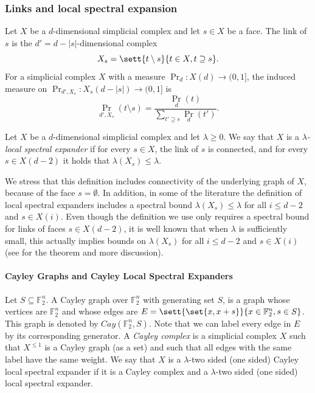 \subsubsection{Links and local spectral expansion} \label{sec:prelims-lse}
Let \(X\) be a \(d\)-dimensional simplicial complex and let \(s \in X\) be a face. The link of \(s\) is the \(d'=d-|s|\)-dimensional complex
\[X_s = \sett{t \setminus s}{t \in X, t \supseteq s}.\] For a simplicial complex \(X\) with a measure \(\Pr_d:X(d) \to (0,1]\), the induced measure on \(\Pr_{d',X_s}:X_s(d-|s|)\to (0,1]\) is \[\Pr_{d',X_s}(t \setminus s) = \frac{\Pr_d(t)}{\sum_{t' \supseteq s} \Pr_d(t')}.\] 

\begin{definition}
    Let \(X\) be a \(d\)-dimensional simplicial complex and let \(\lambda \geq 0\). We say that \(X\) 
    is a \emph{\(\lambda\)-local spectral expander} if for every \(s \in X\), the link of \(s\) is connected, and for every \(s \in X(d-2)\) it holds that \(\lambda(X_s) \leq \lambda\).
\end{definition}
We stress that this definition includes connectivity of the underlying graph of \(X\), because of the face \(s= \emptyset\). In addition, in some of the literature the definition of local spectral expanders includes a spectral bound \(\lambda(X_s) \leq \lambda\) for all \(i \leq d-2\) and \(s \in X(i)\). Even though the definition we use only requires a spectral bound for links of faces \(s \in X(d-2)\), it is well known that when \(\lambda\) is sufficiently small, this actually implies bounds on \(\lambda(X_s)\) for all \(i \leq d-2\) and \(s \in X(i)\) (see \cite{oppenheim2018local} for the theorem and more discussion).

\paragraph{Cayley Graphs and Cayley Local Spectral Expanders}
Let \(S \subseteq \mathbb{F}_2^n\). A Cayley graph over \(\mathbb{F}_2^n\) with generating set \(S\), is a graph whose vertices are \(\mathbb{F}_2^n\) and whose edges are \(E = \sett{\set{x,x+s}}{x \in \mathbb{F}_2^n, s \in S}\). This graph is denoted by \(Cay(\mathbb{F}_2^n,S)\). Note that we can label every edge in \(E\) by its corresponding generator. A \emph{Cayley complex} is a simplicial complex \(X\) such that \(X^{\leq 1}\) is a Cayley graph (as a set) and such that all edges with the same label have the same weight. We say that \(X\) is a \(\lambda\)-two sided (one sided) Cayley local spectral expander if it is a Cayley complex and a \(\lambda\)-two sided (one sided) local spectral expander.

